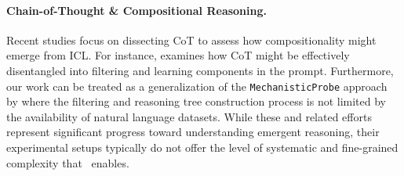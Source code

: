 \paragraph{Chain-of-Thought \& Compositional Reasoning.}
Recent studies focus on dissecting CoT to assess how compositionality might emerge from ICL. For instance, \cite{li2023dissecting} examines how CoT might be effectively disentangled into filtering and learning components in the prompt. Furthermore, our work can be treated as a generalization of the \texttt{MechanisticProbe} approach by  \cite{hou2023towards} where the filtering and reasoning tree construction process is not limited by the availability of natural language datasets.  While these and related efforts \cite{yang2024context,prabhakar2024deciphering} represent significant progress toward understanding emergent reasoning, their experimental setups typically do not offer the level of systematic and fine-grained complexity that \coticl~enables.

\bigskip


\vspace{-5mm}